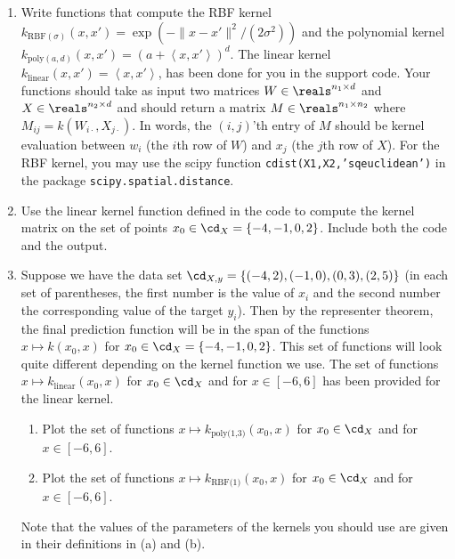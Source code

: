 \documentclass{article}
\theoremstyle{plain}
\theoremstyle{definition}
\begin{document}
\begin{enumerate}
  \setcounter{enumi}{\value{saveenum}}
\item Write functions that compute the RBF kernel $k_{\text{RBF}(\sigma)}(x,x')=\exp\left(-\|x-x'\|^{2}/\left(2\sigma^{2}\right)\right)$
and the polynomial kernel $k_{\text{poly}(a,d)}(x,x')=\left(a+\left\langle x,x'\right\rangle \right)^{d}$.
The linear kernel $k_{\text{linear}}(x,x')=\left\langle x,x'\right\rangle $,
has been done for you in the support code. Your functions should take
as input two matrices $W\in\reals^{n_{1}\times d}$ and $X\in\reals^{n_{2}\times d}$
and should return a matrix $M\in\reals^{n_{1}\times n_{2}}$ where
$M_{ij}=k(W_{i\cdot},X_{j\cdot})$. In words, the $(i,j)$'th entry
of $M$ should be kernel evaluation between $w_{i}$ (the $i$th row
of $W$) and $x_{j}$ (the $j$th row of $X$).
For the RBF kernel, you may use the scipy function \texttt{cdist(X1,X2,'sqeuclidean')}
in the package \texttt{scipy.spatial.distance}. 
\item Use the linear kernel function defined in the code to compute the
kernel matrix on the set of points $x_{0}\in\cd_{X}=\left\{ -4,-1,0,2\right\} $.
Include both the code and the output. 
\item Suppose we have the data set $\cd_{X,y}= \left\{ (-4,2),(-1,0),(0,3),(2,5)\right\} $ (in each set of parentheses, the first number is the value of $x_i$ and the second number the corresponding value of the target $y_i$).
Then by the representer theorem, the final prediction function will
be in the span of the functions $x\mapsto k(x_{0},x)$ for $x_{0}\in\cd_{X}=\left\{ -4,-1,0,2\right\} $.
This set of functions will look quite different depending on the kernel
function we use. The set of functions $x\mapsto k_{\text{linear}}(x_{0},x)$ for
$x_{0}\in\cd_{X}$ and for $x\in[-6,6]$ has been provided for the linear kernel.
\begin{enumerate}
\item Plot the set of functions $x\mapsto k_{\text{poly(1,3)}}(x_{0},x)$
for $x_{0}\in\cd_{X}$ and for $x\in[-6,6]$.
\item Plot the set of functions $x\mapsto k_{\text{RBF(1)}}(x_{0},x)$ for
$x_{0}\in\cd_{X}$ and for $x\in[-6,6]$.
\end{enumerate}
Note that the values of the parameters of the kernels you should use are given in their definitions in (a) and (b).


\end{enumerate}
\end{document}
